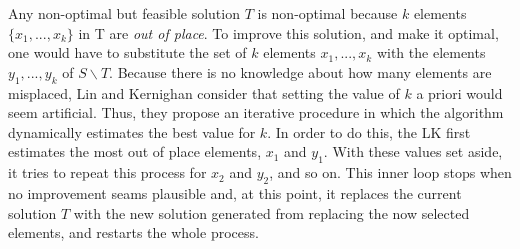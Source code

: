 Any non-optimal but feasible solution $T$ is non-optimal because $k$ elements $\{x_1, ..., x_k\}$ in T are \textit{out of place}. To improve this solution, and make it optimal, one would have to substitute the set of $k$ elements $x_1, ..., x_k$ with the elements $y_1, ..., y_k$ of $S \backslash T$. Because there is no knowledge about how many elements are misplaced, Lin and Kernighan consider that setting the value of $k$ a priori would seem artificial. Thus, they propose an iterative procedure in which the algorithm dynamically estimates the best value for $k$. In order to do this, the LK first estimates the most out of place elements, $x_1$ and $y_1$. With these values set aside, it tries to repeat this process for $x_2$ and $y_2$, and so on. This inner loop stops when no improvement seams plausible and, at this point, it replaces the current solution $T$ with the new solution generated from replacing the now selected elements, and restarts the whole process. 




